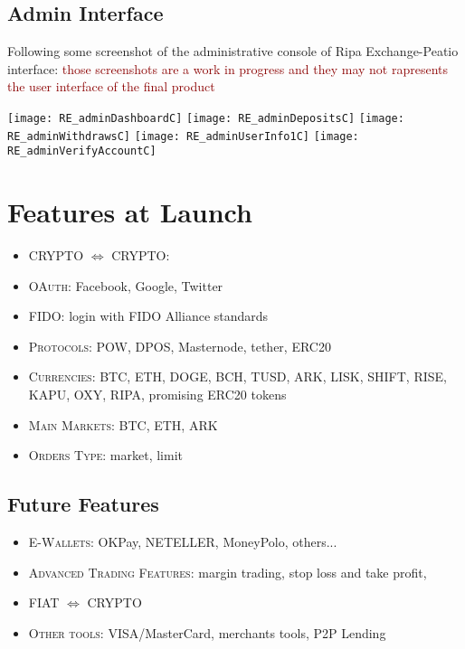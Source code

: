 \documentclass[11pt,fleqn,oneside]{book} %
\begin{document}
\subsection{Admin Interface}
Following some screenshot of the administrative console of Ripa Exchange-Peatio interface: 
\textcolor{darkred}{those screenshots are a work in progress and they may not rapresents the user interface of the final product}\\
\begin{center}
	\texttt{[image: RE\_adminDashboardC]}
	\texttt{[image: RE\_adminDepositsC]}
	\texttt{[image: RE\_adminWithdrawsC]}
	\texttt{[image: RE\_adminUserInfo1C]}
	\texttt{[image: RE\_adminVerifyAccountC]}
\end{center}

\section{Features at Launch}
\begin{itemize}
	\item \textsc{CRYPTO $\Leftrightarrow$ CRYPTO}:
	\item \textsc{OAuth}: Facebook, Google, Twitter
	\item \textsc{FIDO}: login with FIDO Alliance standards
	\item \textsc{Protocols}: POW, DPOS, Masternode, tether, ERC20
	\item \textsc{Currencies}: BTC, ETH, DOGE, BCH, TUSD, ARK, LISK, SHIFT, RISE, KAPU, OXY, RIPA, promising ERC20 tokens
	\item \textsc{Main Markets}: BTC, ETH, ARK
	\item \textsc{Orders Type}: market, limit
\end{itemize}

\subsection{Future Features}
\begin{itemize}
	\item \textsc{E-Wallets}: OKPay, NETELLER, MoneyPolo, others...
	\item \textsc{Advanced Trading Features}: margin trading, stop loss and take profit, 
	\item \textsc{FIAT $\Leftrightarrow$ CRYPTO}
	\item \textsc{Other tools}: VISA/MasterCard, merchants tools, P2P Lending 
\end{itemize}
\end{document}
